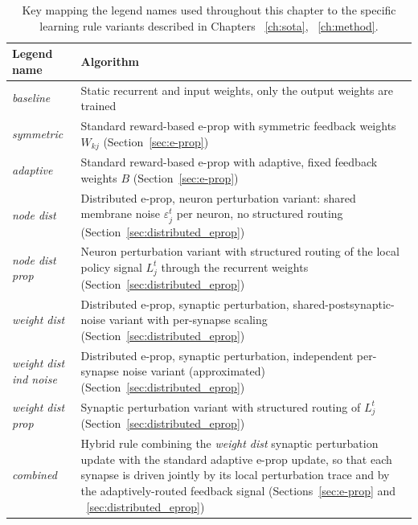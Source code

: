 \begin{table}[H]
    \centering
    \begin{tabularx}{\textwidth}{l X}
        \toprule
        \textbf{Legend name} & \textbf{Algorithm} \\
        \midrule
        \emph{baseline} & 
            Static recurrent and input weights, only the output weights are trained \\[4pt]
        \emph{symmetric} &
            Standard reward-based e-prop with symmetric feedback weights
            $W_{kj}$ (Section~\ref{sec:e-prop}) \\[4pt]
        \emph{adaptive} &
            Standard reward-based e-prop with adaptive, fixed feedback weights
            $B$ (Section~\ref{sec:e-prop}) \\[4pt]
        \emph{node dist} &
            Distributed e-prop, neuron perturbation variant: shared membrane
            noise $\varepsilon^t_j$ per neuron, no structured routing
            (Section~\ref{sec:distributed_eprop}) \\[4pt]
        \emph{node dist prop} &
            Neuron perturbation variant with structured routing of the local
            policy signal $L^t_j$ through the recurrent weights
            (Section~\ref{sec:distributed_eprop}) \\[4pt]
        \emph{weight dist} &
            Distributed e-prop, synaptic perturbation, shared-postsynaptic-noise
            variant with per-synapse scaling
            (Section~\ref{sec:distributed_eprop}) \\[4pt]
        \emph{weight dist ind noise} &
            Distributed e-prop, synaptic perturbation, independent
            per-synapse noise variant (approximated)
            (Section~\ref{sec:distributed_eprop}) \\[4pt]
        \emph{weight dist prop} &
            Synaptic perturbation variant with structured routing of $L^t_j$
            (Section~\ref{sec:distributed_eprop}) \\[4pt]
        \emph{combined} &
            Hybrid rule combining the \emph{weight dist} synaptic
            perturbation update with the standard adaptive e-prop update,
            so that each synapse is driven jointly by its local perturbation
            trace and by the adaptively-routed feedback signal
            (Sections~\ref{sec:e-prop} and ~\ref{sec:distributed_eprop}) \\ [4pt]
        \bottomrule
    \end{tabularx}
    \caption{Key mapping the legend names used throughout this chapter to the
    specific learning rule variants described in Chapters ~\ref{ch:sota}, ~\ref{ch:method}.}
    \label{tab:variant-naming}
\end{table}

